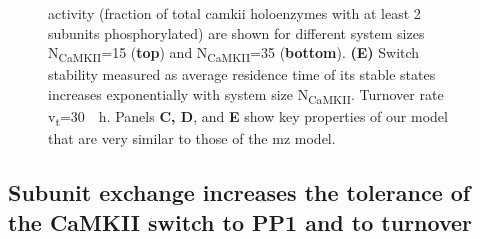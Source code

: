\documentclass[9pt,lineno,doublespacing]{elife}
\newcommand\SUB[2]{#1\textsubscript{#2}}
\begin{document}
\begin{figure}[t]
{        activity (fraction of total \gls{camkii} holoenzymes with at least 2
        subunits phosphorylated) are shown for different system sizes
        \SUB{N}{CaMKII}=15 (\textbf{top}) and \SUB{N}{CaMKII}=35
        (\textbf{bottom}). \textbf{(E)} Switch stability measured as average
        residence time of its stable states increases exponentially with system
        size \SUB{N}{CaMKII}. Turnover rate \SUB{v}{t}=\SI{30}{\per \hour}.
        Panels \textbf{C, D}, and \textbf{E} show key properties of our model
        that are very similar to those of the \gls{mz} model.
    }\label{fig:validation} 
\end{figure}


\subsection{Subunit exchange increases the tolerance of the CaMKII switch to PP1
and to turnover}\label{subsec:result_tolerance}
\end{document}
